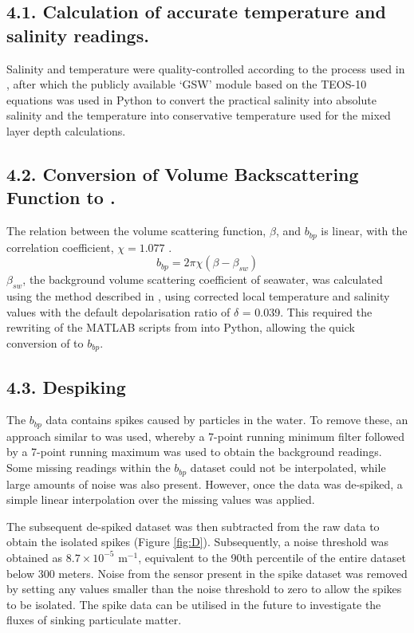 \documentclass[
	a4paper, %
	10pt, %
	unnumberedsections, %
	twoside, %
]{LTJournalArticle}
\begin{document}
\begin{multicols}{2}
\subsection{4.1. Calculation of accurate temperature and salinity readings.}
Salinity and temperature were quality-controlled according to the process used in \citet{ref2}, after which the publicly available ‘GSW’
module based on the TEOS-10 equations \citep{ref9} was used in Python to convert the practical salinity into absolute salinity and the
temperature into conservative temperature used for the mixed layer depth calculations.

\subsection{4.2. Conversion of Volume Backscattering Function to .}
The relation between the volume scattering function, $\beta$, and $b_{bp}$ is linear,
with the correlation coefficient, $\chi = 1.077$ \citep{ref5}.
\begin{equation}
	b_{bp} = 2 \pi \chi (\beta - \beta_{sw})
	\label{eq:1}
\end{equation}
$\beta_{sw}$, the background volume scattering coefficient of seawater, was calculated using the method described in \citet{ref6}, using corrected local temperature and
salinity values with the default depolarisation ratio of $\delta$ = 0.039. This required the rewriting of the MATLAB
scripts from \citet{ref6} into Python, allowing the quick conversion of  to $b_{bp}$.

\subsection{4.3.  Despiking}

The $b_{bp}$ data contains spikes caused by particles in the water. To remove these, an approach similar to
\citet{ref10} was used, whereby a 7-point running minimum filter followed by a 7-point running maximum was used
to obtain the background readings. Some missing readings within the $b_{bp}$ dataset could not be interpolated,
while large amounts of noise was also present. However, once the data was de-spiked, a simple linear interpolation
over the missing values was applied.

The subsequent de-spiked dataset was then subtracted from the raw data to
obtain the isolated spikes (Figure \ref{fig:D}). Subsequently, a noise threshold was obtained as $8.7 \times 10^{-5} $ m$^{-1}$,
equivalent to the 90th percentile of the entire dataset below 300 meters. Noise from the sensor present in the
spike dataset was removed by setting any values smaller than the noise threshold to zero to allow the spikes to be isolated.
The spike data can be utilised in the future to investigate the fluxes of sinking particulate matter.


\end{multicols}
\end{document}
